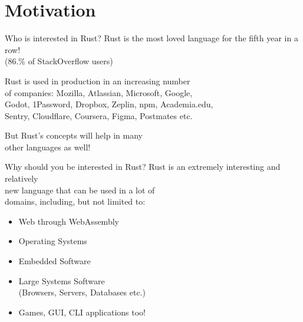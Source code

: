 \documentclass[usenames,dvipsnames,10pt,aspectratio=169]{beamer}
\begin{document}
 
\section{Motivation}%
 
\begin{frame}{Who is interested in Rust?}
	\large
	\textcolor{ucuyellow}{Rust is the most loved language for the fifth year in a row!}\\
	\footnotesize{(86.\% of StackOverflow users)}

	\vspace{0.5cm}

	\large
	Rust is used in production in an increasing number\\
	of companies: Mozilla, Atlassian, Microsoft, Google,\\
	Godot, 1Password, Dropbox, Zeplin, npm, Academia.edu,\\
	Sentry, Cloudflare, Coursera, Figma, Postmates etc.

	\vspace{0.5cm}

	\large
	But Rust's concepts will help in many\\
	other languages as well!
\end{frame} 

\begin{frame}{Why should you be interested in Rust?}
	\large
	Rust is an extremely interesting and relatively\\
	new language that can be used in a lot of\\
	domains, including, but not limited to:\\
	\vspace{0.4cm}
	\begin{itemize}[label=$\bullet$]
		\item Web through WebAssembly
		\item Operating Systems
		\item Embedded Software
		\item Large Systems Software\\
			(Browsers, Servers, Databases etc.)
		\item Games, GUI, CLI applications too!
	\end{itemize}
\end{frame}
\end{document}
